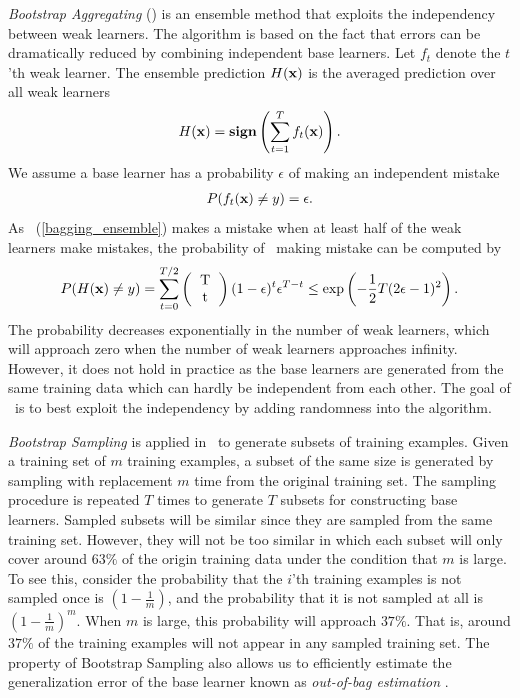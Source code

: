 {\textit{Bootstrap Aggregating} (\bagging) \citep{Breiman96bagging} is an ensemble method that exploits the independency between weak learners.
The algorithm is based on the fact that errors can be dramatically reduced by combining independent base learners.
Let $f_t$ denote the $t$'th weak learner.
The ensemble prediction $H(\mathbf {x})$ is the averaged prediction over all weak learners
\begin{align}
	H(\mathbf {x}) = \textbf{sign}\left(\sum_{t=1}^{T}f_t(\mathbf {x})\right). \label{bagging_ensemble}
\end{align}
We assume a base learner has a probability $\epsilon$ of making an independent mistake
\begin{align*}
	P(f_t(\mathbf {x}) \ne y) = \epsilon.
\end{align*}
As \bagging\ (\ref{bagging_ensemble}) makes a mistake when at least half of the weak learners make mistakes, the probability of \bagging\ making mistake can be computed by
\begin{align*}
	P(H(\vx)\neq y) = \sum_{t=0}^{T/2}\left(\begin{tabular}{cc}T\\t\end{tabular}\right)(1-\epsilon)^t\epsilon^{T-t} \le\exp\left(-\frac{1}{2}T(2\epsilon-1)^2\right).
\end{align*}
The probability decreases exponentially in the number of weak learners, which will approach zero when the number of weak learners approaches infinity.
However, it does not hold in practice as the base learners are generated from the same training data which can hardly be independent from each other.
The goal of \bagging\ is to best exploit the independency by adding randomness into the algorithm.

\textit{Bootstrap Sampling} \citep{Efron1994introduction} is applied in \bagging\ to generate subsets of training examples.
Given a training set of $m$ training examples, a subset of the same size is generated by sampling with replacement $m$ time from the original training set.
The sampling procedure is repeated $T$ times to generate $T$ subsets for constructing base learners.
Sampled subsets will be similar since they are sampled from the same training set.
However, they will not be too similar in which each subset will only cover around $63\%$ of the origin training data under the condition that $m$ is large.
To see this, consider the probability that the $i$'th training examples is not sampled once is $(1-\frac{1}{m})$, and the probability that it is not sampled at all is $(1-\frac{1}{m})^m$.
When $m$ is large, this probability will approach $37\%$. 
That is, around $37\%$ of the training examples will not appear in any sampled training set.
The property of Bootstrap Sampling also allows us to efficiently estimate the generalization error of the base learner known as \textit{out-of-bag estimation} \citep{Breiman96out,Tibshirani1996bias,Wolpert99an}.

}
